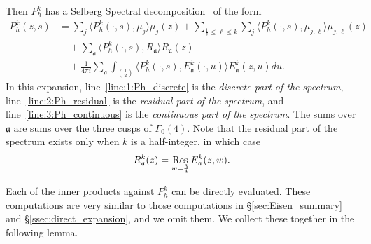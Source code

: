 Then $P_h^k$ has a Selberg Spectral decomposition~\cite{IwaniecKowalski04,
Goldfeld2006automorphic} of the form
\begin{align}
  P_h^k(z,s) &= \sum_j \langle P_h^k(\cdot, s), \mu_j \rangle \mu_j(z) + \sum_{\frac{1}{2}
  \leq \ell \leq k} \sum_j \langle P_h^k(\cdot, s), \mu_{j, \ell}\rangle \mu_{j, \ell}(z)
  \label{line:1:Ph_discrete} \\
  &\quad + \sum_{\mathfrak{a}} \langle P_h^k(\cdot, s), R_{\mathfrak{a}} \rangle
  R_{\mathfrak{a}}(z) \label{line:2:Ph_residual} \\
  &\quad + \frac{1}{4\pi i} \sum_{\mathfrak{a}} \int_{(\frac{1}{2})} \langle P_h^k(\cdot,
  s), E_{\mathfrak{a}}^k (\cdot, u)\rangle E_{\mathfrak{a}}^k (z, u) du.
  \label{line:3:Ph_continuous}
\end{align}
In this expansion, line~\eqref{line:1:Ph_discrete} is the \emph{discrete part of the
spectrum}, line~\eqref{line:2:Ph_residual} is the \emph{residual part of the spectrum},
and line~\eqref{line:3:Ph_continuous} is the \emph{continuous part of the spectrum}.
The sums over $\mathfrak{a}$ are sums over the three cusps of $\Gamma_0(4)$.
Note that the residual part of the spectrum exists only when $k$ is a half-integer, in
which case
\begin{equation}\label{eq:hyp:residual_spec_def}
  R_{\mathfrak{a}}^k(z) = \operatorname*{Res}_{w = \frac{3}{4}} E_{\mathfrak{a}}^k(z, w).
\end{equation}


Each of the inner products against $P_h^k$ can be directly evaluated.
These computations are very similar to those computations in \S\ref{sec:Eisen_summary} and
\S\ref{ssec:direct_expansion}, and we omit them.
We collect these together in the following lemma.


